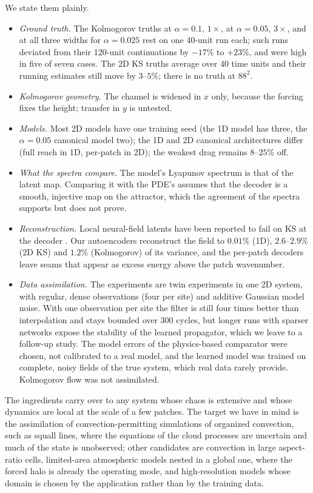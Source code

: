  We state them plainly.
\begin{itemize}
\item \emph{Ground truth.} The Kolmogorov truths at $\alpha=0.1$, $1\times$, at
  $\alpha=0.05$, $3\times$, and at all three widths for $\alpha=0.025$ rest on one
  40-unit run each; such runs deviated from their 120-unit continuations
  by $-17\%$ to $+23\%$, and were high in five of seven cases. The 2D KS truths
  average over 40 time units and their running estimates still move by
  $3$--$5\%$; there is no truth at $88^2$.
\item \emph{Kolmogorov geometry.} The channel is widened in $x$ only,
  because the forcing fixes the height; transfer in $y$ is untested.
\item \emph{Models.} Most 2D models have one training seed (the 1D model
  has three, the $\alpha=0.05$ canonical model two); the 1D and 2D
  canonical architectures differ (full reach in 1D, per-patch in 2D); the
  weakest drag remains $8$--$25\%$ off.
\item \emph{What the spectra compare.} The model's Lyapunov spectrum is
  that of the latent map. Comparing it with the PDE's assumes that the
  decoder is a smooth, injective map on the attractor, which the agreement
  of the spectra supports but does not prove.
\item \emph{Reconstruction.} Local neural-field latents have been
  reported to fail on KS at the decoder \citep{aroma2024}. Our autoencoders
  reconstruct the field to $0.01\%$ (1D), $2.6$--$2.9\%$ (2D KS) and $1.2\%$
  (Kolmogorov) of its variance, and the per-patch decoders leave seams
  that appear as excess energy above the patch wavenumber.
\item \emph{Data assimilation.} The experiments are twin experiments in
  one 2D system, with regular, dense observations (four per site) and
  additive Gaussian model noise. With one observation per site the filter
  is still four times better than interpolation and stays bounded over 300
  cycles, but longer runs with sparser networks expose the stability of the
  learned propagator, which we leave to a follow-up study. The model errors
  of the physics-based comparator were chosen, not calibrated to a real
  model, and the learned model was trained on complete, noisy fields of the
  true system, which real data rarely provide. Kolmogorov flow was not
  assimilated.
\end{itemize}

 The ingredients carry over to any system whose chaos is
extensive and whose dynamics are local at the scale of a few patches. The
target we have in mind is the assimilation of convection-permitting
simulations of organized convection, such as squall lines, where the
equations of the cloud processes are uncertain and much of the state is
unobserved; other candidates are
convection in large aspect-ratio cells, limited-area atmospheric models
nested in a global one, where the forced halo is already the operating
mode, and high-resolution models whose domain is chosen by the
application rather than by the training data.

